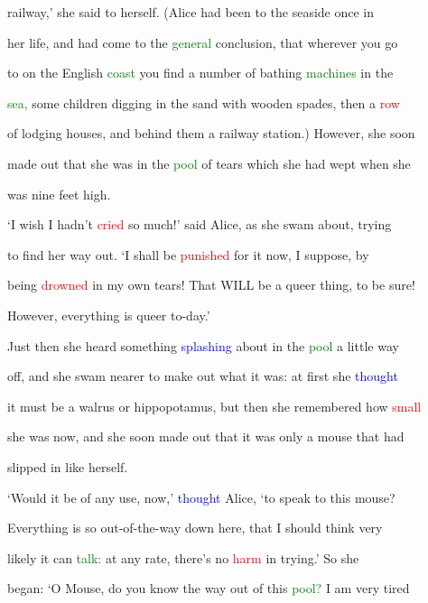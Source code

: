  railway,’ she said to herself. (Alice had been to the seaside once in

 her life, and had come to the \textcolor{green}{general} conclusion, that wherever you go

 to on the English \textcolor{green}{coast} you find a number of bathing \textcolor{green}{machines} in the

 \textcolor{green}{sea,} some \textcolor{BurntOrange}{children} digging in the sand with wooden spades, then a \textcolor{red}{row}

 of lodging houses, and behind them a railway station.) However, she soon

 made out that she was in the \textcolor{green}{pool} of tears which she had wept when she

 was nine feet high.



 ‘I wish I hadn’t \textcolor{red}{cried} so much!’ said Alice, as she swam about, trying

 to find her way out. ‘I shall be \textcolor{red}{punished} for it now, I suppose, by

 being \textcolor{red}{drowned} in my own tears! That WILL be a queer thing, to be sure!

 However, everything is queer to-day.’



 Just then she heard something \textcolor{blue}{splashing} about in the \textcolor{green}{pool} a little way

 off, and she swam nearer to make out what it was: at first she \textcolor{blue}{thought}

 it must be a walrus or hippopotamus, but then she remembered how \textcolor{red}{small}

 she was now, and she soon made out that it was only a mouse that had

 \textcolor{BurntOrange}{slipped} in like herself.



 ‘Would it be of any use, now,’ \textcolor{blue}{thought} Alice, ‘to speak to this mouse?

 Everything is so out-of-the-way down here, that I should think very

 likely it can \textcolor{green}{talk:} at any rate, there’s no \textcolor{red}{harm} in trying.’ So she

 began: ‘O Mouse, do you know the way out of this \textcolor{green}{pool?} I am very tired

